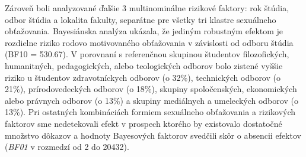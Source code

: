 \documentclass[
]{article}
\begin{document}
\begin{table}[H]

\caption{\label{tab:rfSAB}Sexuálny nátlak - rizikové faktory}
\centering
{}
\end{table}

Zároveň boli analyzované ďalšie 3 multinominálne rizikové faktory: rok štúdia, odbor štúdia a lokalita fakulty, separátne pre všetky tri klastre sexuálneho obťažovania. Bayesiánska analýza ukázala, že jediným robustným efektom je rozdielne riziko rodovo motivovaného obťažovania v závislosti od odboru štúdia (BF10 = 530.67). V porovnaní s referenčnou skupinou študentov filozofických, humanitných, pedagogických, alebo teologických odborov bolo zistené vyššie riziko u študentov zdravotníckych odborov (o 32\%), technických odborov (o 21\%), prírodovedeckých odborov (o 18\%), skupiny spoločenských, ekonomických alebo právnych odborov (o 13\%) a skupiny mediálnych a umeleckých odborov (o 13\%).
Pri ostatných kombináciách formiem sexuálneho obťažovania a rizikových faktorov sme nedetekovali efekt v prospech ktorého by existovalo dostatočné množstvo dôkazov a hodnoty Bayesových faktorov svedčili skôr o absencii efektov (\emph{BF01} v rozmedzí od 2 do 20432).
\end{document}
